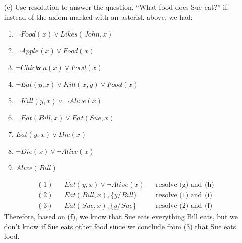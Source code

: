 \documentclass[13pt]{article}
\begin{document}
\begin{enumerate}
\item [(e)] Use resolution to answer the question, “What food does Sue eat?” if, instead of the axiom marked
  with an asterisk above, we had:
    \begin{enumerate}[label=(\alph*)]
  \item $\neg Food(x) \lor Likes(John, x)$
  \item $\neg Apple(x) \lor Food(x)$
  \item $\neg Chicken(x) \lor Food(x)$
  \item $\neg Eat(y, x) \lor Kill(x, y) \lor Food(x)$
  \item $\neg Kill(y, x) \lor \neg Alive(x)$
  \item $\neg Eat(Bill, x) \lor Eat(Sue, x)$
  \item $Eat(y, x) \lor Die(x)$
  \item $\neg Die(x) \lor \neg Alive(x)$
  \item $Alive(Bill)$
  \end{enumerate}
    \begin{align*}
      (1) && Eat(y, x) \lor \neg Alive(x) && \text{resolve (g) and (h)} \\
      (2) && Eat(Bill, x), \{y/Bill\} && \text{resolve (1) and (i)} \\
      (3) && Eat(Sue, x), \{y/Sue\} && \text{resolve (2) and (f)}
    \end{align*}
    Therefore, based on (f), we know that Sue eats everything Bill eats, but we don't know if Sue eats other food since we conclude from (3) that Sue eats food.
\end{enumerate}
\end{document}
